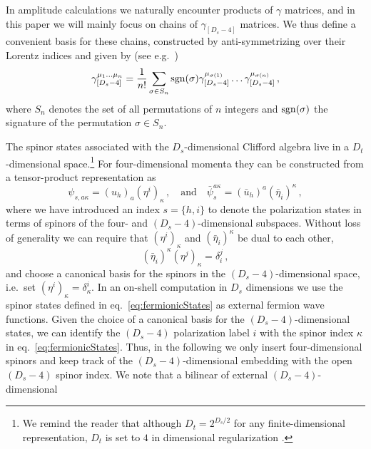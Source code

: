 In amplitude calculations we naturally encounter products of
$\gamma$ matrices, and in this paper we will mainly focus
on chains of $\gamma_{[D_s-4]}$ matrices. 
We thus define a convenient basis for these chains, 
constructed by anti-symmetrizing over their Lorentz
indices and given by (see e.g.\ \cite{Kreuzer:susylectures})
\begin{align}\label{eq:basisGammaChainDs}
\gamma_{[D_s-4]}^{\mu_1 \ldots \mu_n} = \frac{1}{n!} \sum_{ \sigma\in S_n} \operatorname{sgn}(\sigma) \gamma_{[D_s-4]}^{\mu_{\sigma(1)}} \ldots \gamma_{[D_s-4]}^{\mu_{\sigma(n)}}\,,
\end{align}
where $S_n$ denotes the set of all permutations of $n$
integers and $\operatorname{sgn}(\sigma)$ the signature of the permutation
$\sigma\in S_n$.

The spinor states associated with the $D_s$-dimensional 
Clifford algebra live in a $D_t$-dimensional space.\footnote{We 
remind the reader that although $D_t=2^{D_s/2}$ for any 
finite-dimensional representation, $D_t$ is set to $4$ in 
dimensional regularization \cite{Collins:1984xc}.}
For four-dimensional momenta they can be constructed from a 
tensor-product representation as
\begin{equation} 
\label{eq:fermionicStates}
\psi_{s,a \kappa} =  (u_h)_a (\eta^i)_\kappa \,,
\quad\mbox{and}\quad
\bar \psi_s^{a \kappa} = 
(\bar u_h)^{a}  (\bar \eta_i)^\kappa\,,
\end{equation}
%
where we have introduced an index $s=\{h, i \}$ to denote the
polarization states in terms of spinors of the four- and 
$(D_s-4)$-dimensional subspaces. 
Without loss of generality we can
require that $(\eta^i)_\kappa$ and $(\bar \eta_i)^\kappa$ 
be dual to each other,
%
\begin{equation}
\label{eqn:qspinors}
(\bar \eta_i)^\kappa (\eta^j)_\kappa = \delta_i^j\,,
\end{equation}
and choose a canonical basis for the 
spinors in the $(D_s-4)$-dimensional space,
i.e.\ set $(\eta^i)_\kappa=\delta^i_\kappa$.
%
In an on-shell computation in $D_s$ dimensions we use the 
spinor states defined in eq.~\eqref{eq:fermionicStates}
as external fermion wave functions.
Given the choice of a canonical basis for the 
$(D_s-4)$-dimensional states, we can identify the
$(D_s-4)$ polarization label $i$ with the spinor index 
$\kappa$ in eq.~\eqref{eq:fermionicStates}.
Thus, in the following we only insert four-dimensional spinors
and keep track of the $(D_s-4)$-dimensional embedding with 
the open $(D_s-4)$ spinor index.
We note that a bilinear of external $(D_s-4)$-dimensional
